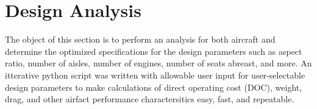 \documentclass{article}
\begin{document}
\section{Design Analysis}
    \begin{flushleft}
        The object of this section is to perform an analysis for both aircraft
        and determine the optimized specifications for the design parameters
        such as aspect ratio, number of aisles, number of engines, number of
        seats abreast, and more. An itterative python script was written with
        allowable user input for user-selectable design parameters to make
        calculations of direct operating cost (DOC), weight, drag, and other
        airfact performance charactersitics easy, fast, and repeatable.
    \end{flushleft}
\end{document}
